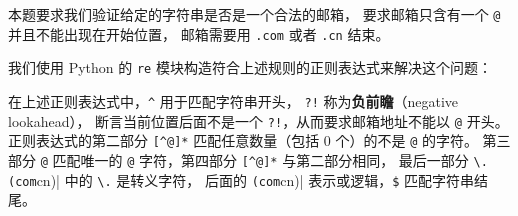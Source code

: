 \documentclass[openany, 10pt]{ctexart}
\begin{document}
本题要求我们验证给定的字符串是否是一个合法的邮箱，
要求邮箱只含有一个 \lstinline|@| 并且不能出现在开始位置，
邮箱需要用 \lstinline|.com| 或者 \lstinline|.cn| 结束。

我们使用 Python 的 \lstinline|re| 模块构造符合上述规则的正则表达式来解决这个问题：


在上述正则表达式中，\lstinline|^| 用于匹配字符串开头，
\lstinline|?!| 称为{\bfseries 负前瞻}（negative lookahead），
断言当前位置后面不是一个 \lstinline|?!|，从而要求邮箱地址不能以 \lstinline|@| 开头。
正则表达式的第二部分 \lstinline|[^@]*| 匹配任意数量（包括 $0$ 个）的不是 \lstinline|@| 的字符。
第三部分 \lstinline|@| 匹配唯一的 \lstinline|@| 字符，第四部分 \lstinline|[^@]*| 与第二部分相同，
最后一部分 \lstinline|\.(com|cn)| 中的 \lstinline|\.| 是转义字符，
后面的 \lstinline|(com|cn)| 表示或逻辑，\lstinline|$| 匹配字符串结尾。
\end{document}
